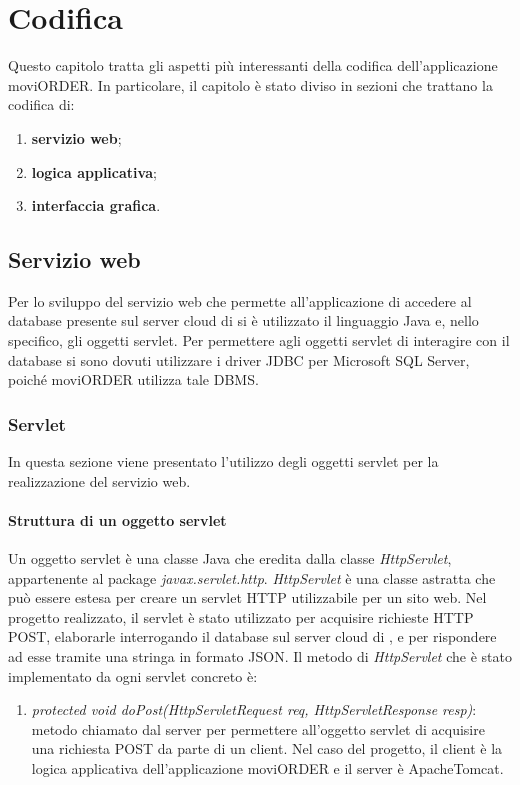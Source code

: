 \chapter{Codifica}

Questo capitolo tratta gli aspetti più interessanti della codifica dell'applicazione moviORDER. In particolare, il capitolo è stato diviso in sezioni che trattano la codifica di:
\begin{enumerate}
	\item \textbf{servizio web};
	\item \textbf{logica applicativa};
	\item \textbf{interfaccia grafica}.
\end{enumerate}

\section{Servizio web}

Per lo sviluppo del servizio web che permette all'applicazione di accedere al database presente sul server cloud di \visione{} si è utilizzato il linguaggio Java e, nello specifico, gli oggetti servlet. Per permettere agli oggetti servlet di interagire con il database si sono dovuti utilizzare i driver JDBC per Microsoft SQL Server, poiché moviORDER utilizza tale DBMS. 

\subsection{Servlet}

In questa sezione viene presentato l'utilizzo degli oggetti servlet per la realizzazione del servizio web.

\subsubsection{Struttura di un oggetto servlet}

Un oggetto servlet è una classe Java che eredita dalla classe \textit{HttpServlet}, appartenente al package \textit{javax.servlet.http}. \textit{HttpServlet} è una classe astratta che può essere estesa per creare un servlet HTTP utilizzabile per un sito web. Nel progetto realizzato, il servlet è stato utilizzato per acquisire richieste HTTP POST, elaborarle interrogando il database sul server cloud di \visione{}, e per rispondere ad esse tramite una stringa in formato JSON. Il metodo di \textit{HttpServlet} che è stato implementato da ogni servlet concreto è:
\begin{enumerate}
	\item \textit{protected void doPost(HttpServletRequest req, HttpServletResponse resp)}: metodo chiamato dal server per permettere all'oggetto servlet di acquisire una richiesta POST da parte di un client. Nel caso del progetto, il client è la logica applicativa dell'applicazione moviORDER e il server è ApacheTomcat.
\end{enumerate}

